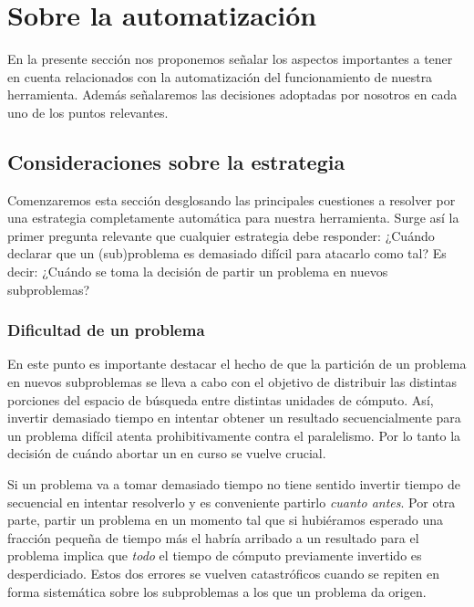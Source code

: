 
\section{Sobre la automatización}

En la presente sección nos proponemos señalar los aspectos importantes a tener
en cuenta relacionados con la automatización del funcionamiento de nuestra
herramienta. Además señalaremos las decisiones adoptadas por nosotros en cada
uno de los puntos relevantes.

\subsection{Consideraciones sobre la estrategia}

Comenzaremos esta sección desglosando las principales cuestiones a
resolver por una estrategia completamente automática para nuestra herramienta.
Surge así la primer pregunta relevante que cualquier estrategia debe
responder: ¿Cuándo declarar que un (sub)problema es demasiado difícil para
atacarlo como tal? Es decir: ¿Cuándo se toma la decisión de partir un problema
en nuevos subproblemas?

\subsubsection{Dificultad de un problema}

En este punto es importante destacar el hecho de que la partición de un
problema en nuevos subproblemas se lleva a cabo con el objetivo de distribuir
las distintas porciones del espacio de búsqueda entre distintas unidades de
cómputo. Así, invertir demasiado tiempo en intentar obtener un resultado
secuencialmente para un problema difícil atenta prohibitivamente contra el
paralelismo. Por lo tanto la decisión de cuándo abortar un \solving en curso
se vuelve crucial.

Si un problema va a tomar demasiado tiempo no tiene sentido invertir tiempo de
\solving secuencial en intentar resolverlo y es conveniente partirlo
\emph{cuanto antes}. Por otra parte, partir un problema en un momento tal que
si hubiéramos esperado una fracción  pequeña de tiempo más el \w habría
arribado a un resultado para el problema implica que \emph{todo} el tiempo de
cómputo previamente invertido es desperdiciado. Estos dos errores se vuelven
catastróficos cuando se repiten en forma sistemática sobre los subproblemas a los que un problema da origen.

